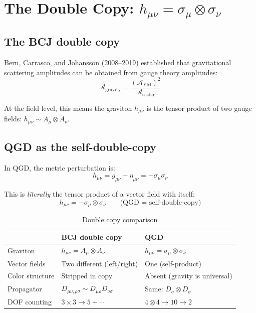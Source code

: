 \documentclass[11pt,a4paper]{article}
\theoremstyle{plain}
\theoremstyle{definition}
\theoremstyle{remark}
\begin{document}
\section{The Double Copy: $h_{\mu\nu} = \sigma_\mu\otimes\sigma_\nu$}
\label{sec:double_copy}

\subsection{The BCJ double copy}

Bern, Carrasco, and Johansson (2008--2019) established that gravitational scattering amplitudes can be obtained from gauge theory amplitudes:
\begin{equation}
  \mathcal{A}_{\mathrm{gravity}} = \frac{(\mathcal{A}_{\mathrm{YM}})^2}{\mathcal{A}_{\mathrm{scalar}}}
\end{equation}

At the field level, this means the graviton $h_{\mu\nu}$ is the tensor product of two gauge fields: $h_{\mu\nu} \sim A_\mu\otimes\tilde A_\nu$.

\subsection{QGD as the self-double-copy}

In QGD, the metric perturbation is:
\begin{equation}
  h_{\mu\nu} = g_{\mu\nu} - \eta_{\mu\nu} = -\sigma_\mu\sigma_\nu
\end{equation}

This is \emph{literally} the tensor product of a vector field with itself:
\begin{equation}
  \boxed{h_{\mu\nu} = -\sigma_\mu\otimes\sigma_\nu \qquad\text{(QGD = self-double-copy)}}
\end{equation}

\begin{table}[h]
  \centering
  \caption{Double copy comparison}
  \renewcommand{\arraystretch}{1.3}
  \begin{tabular}{@{}lll@{}}
    \toprule
    & BCJ double copy & QGD \\
    \midrule
    Graviton & $h_{\mu\nu} = A_\mu\otimes\tilde A_\nu$ & $h_{\mu\nu} = \sigma_\mu\otimes\sigma_\nu$ \\
    Vector fields & Two different (left/right) & One (self-product) \\
    Color structure & Stripped in copy & Absent (gravity is universal) \\
    Propagator & $D_{\mu\nu,\rho\sigma} \sim D_{\mu\rho}D_{\nu\sigma}$ & Same: $D_\sigma\otimes D_\sigma$ \\
    DOF counting & $3\times3 \to 5+\cdots$ & $4\otimes4 \to 10 \to 2$ \\
    \bottomrule
  \end{tabular}
\end{table}
\end{document}
